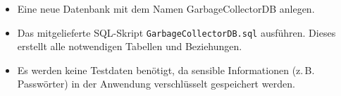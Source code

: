 \begin{itemize}
    \item Eine neue Datenbank mit dem Namen \glqq GarbageCollectorDB\grqq{} anlegen.
    \item Das mitgelieferte SQL-Skript \texttt{GarbageCollectorDB.sql} ausführen. Dieses erstellt alle notwendigen Tabellen und Beziehungen.
    \item Es werden keine Testdaten benötigt, da sensible Informationen (z.\,B. Passwörter) in der Anwendung verschlüsselt gespeichert werden.
\end{itemize}